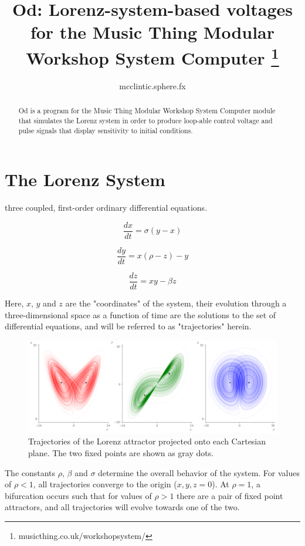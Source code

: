 \documentclass{tufte-handout}
\title{Od: Lorenz-system-based voltages for the Music Thing Modular Workshop System Computer
\thanks{musicthing.co.uk/workshopsystem/}}
\author[mcclintic.sphere.fx]{mcclintic.sphere.fx}
\begin{document}
\maketitle%

\begin{abstract}
\noindent
Od is a program for the Music Thing Modular Workshop System Computer
module that simulates the Lorenz system in order to produce loop-able 
control voltage and pulse signals that display sensitivity to initial conditions.
\end{abstract}


\section{The Lorenz System}\label{sec:the-lorenz-system}

 three coupled, first-order ordinary differential equations.

$$\frac{dx}{dt} = \sigma(y - x)$$

$$\frac{dy}{dt} = x(\rho - z) - y$$

$$\frac{dz}{dt} = x y - \beta z$$

Here, $x$, $y$ and $z$ are the "coordinates" of the system, their evolution through a three-dimensional space as a function of time are the solutions to the set of differential equations, and will be referred to as "trajectories" herein.

\begin{figure}[h]
  \includegraphics[width=\linewidth]{lorenz_attractor.png}%
  \caption{Trajectories of the Lorenz attractor projected onto each Cartesian plane. The two fixed points are shown as gray dots.}%
  \label{fig:fullfig}%
\end{figure}

The constants $\rho$, $\beta$ and $\sigma$ determine the overall behavior of the system. For values of $\rho < 1$, all trajectories converge to the origin ($x, y, z = 0$). At $\rho=1$, a bifurcation occurs such that for values of $\rho > 1$ there are a pair of fixed point attractors, and all trajectories will evolve towards one of the two. 
\end{document}
